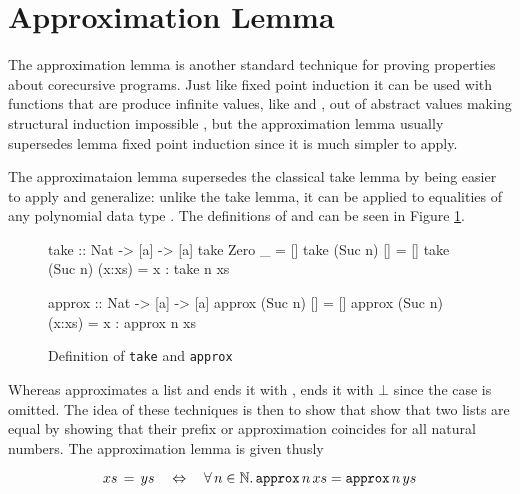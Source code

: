 \section{Approximation Lemma}
\label{sec:approx}

The approximation lemma is another standard technique for proving
properties about corecursive programs. Just like fixed point induction
it can be used with functions that are produce infinite values, like
 and , out of abstract values making structural
induction impossible \cite{corecursive}, but the approximation lemma
usually supersedes lemma fixed point induction since it is much
simpler to apply.

The approximataion lemma supersedes the classical take lemma
\cite{introfp} by being easier to apply and generalize: unlike the
take lemma, it can be applied to equalities of any polynomial data
type \cite{genapprox}. The definitions of  and 
can be seen in Figure \ref{code:takeapprox}.

\begin{figure}[h!]
\centering
\begin{minipage}[b]{6.2cm}
\begin{code}
take :: Nat -> [a] -> [a]
take Zero    _      = []
take (Suc n) []     = []
take (Suc n) (x:xs) = x : take n xs
\end{code}
\end{minipage}
\hspace{10pt}
\begin{minipage}[b]{6.7cm}
\begin{code}
approx :: Nat -> [a] -> [a]
approx (Suc n) []     = []
approx (Suc n) (x:xs) = x : approx n xs
\end{code}
\end{minipage}
\caption{Definition of \texttt{take} and \texttt{approx}
\label{code:takeapprox}
}
\end{figure}

Whereas  approximates a list and ends it with \hs{[]},
 ends it with $\bot$ since the  case is
omitted. The idea of these techniques is then to show that show that
two lists are equal by showing that their prefix or approximation
coincides for all natural numbers. The approximation lemma is given thusly

\begin{equation}
\label{eq:approxeq}
xs \, = \, ys \quad \Leftrightarrow \quad \fa{n \in \mathbb{N}} \hs{approx} \, n \, xs = \hs{approx} \, n \, ys
\end{equation}

